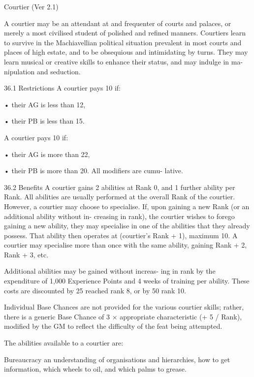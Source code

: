 \begin{Chapter}{Courtier (Ver 2.1)}

A courtier may be an attendant at and frequenter of 
courts  and  palaces,  or  merely  a  most  civilised 
student of polished and refined manners. Courtiers 
learn  to  survive  in  the  Machiavellian  political 
situation  prevalent  in  most  courts  and  places  of 
high  estate,  and to  be  obsequious  and intimidating 
by turns. They may learn musical or creative skills 
to  enhance  their  status,  and  may  indulge  in  ma-
nipulation and seduction. 

36.1 Restrictions 
A courtier pays 10%
if:  

• their AG is less than 12,  

• their PB is less than 15. 

A courtier pays 10%
if:  

• their AG is more than 22,  

• their PB is more than 20. All modifiers are cumu-
lative. 

36.2 Benefits 
A courtier gains 2 abilities at Rank 0, and 1 further 
ability per Rank. All abilities are usually performed 
at  the  overall  Rank  of  the  courtier.  However,  a 
courtier may choose to specialise. If, upon gaining 
a  new  Rank  (or  an  additional  ability  without  in-
creasing  in  rank),  the  courtier  wishes  to  forego 
gaining a new ability, they may specialise in one of 
the  abilities  that  they  already  possess.  That  ability 
then  operates  at  (courtier’s  Rank  +  1),  maximum 
10. A courtier may specialise more than once with 
the same ability, gaining Rank + 2, Rank + 3, etc. 

Additional abilities may be gained without increas-
ing in rank by the expenditure of 1,000 Experience 
Points  and  4  weeks  of  training  per  ability.  These 
costs  are  discounted  by  25%
reached  rank  8,  or  by  50%
rank 10. 

Individual  Base  Chances  are  not  provided  for  the 
various  courtier  skills;  rather,  there  is  a  generic 
Base Chance of 3 × appropriate characteristic (+ 5 / 
Rank), modified by the GM to reflect the difficulty 
of the feat being attempted. 

The abilities available to a courtier are: 

Bureaucracy  an  understanding  of  organisations 
and  hierarchies,  how  to  get  information,  which 
wheels to oil, and which palms to grease. 


\end{Chapter}
